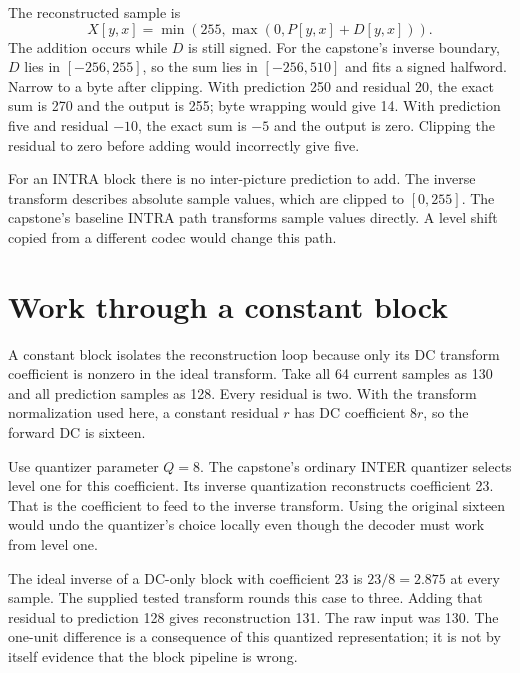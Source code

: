 The reconstructed sample is
\[
  X[y,x]=\min(255,\max(0,P[y,x]+D[y,x])).
\]
The addition occurs while $D$ is still signed. For the capstone's inverse boundary,
$D$ lies in $[-256,255]$, so the sum lies in $[-256,510]$ and fits a signed halfword.
Narrow to a byte after clipping. With prediction 250 and residual 20, the exact
sum is 270 and the output is 255; byte wrapping would give 14. With prediction
five and residual $-10$, the exact sum is $-5$ and the output is zero. Clipping
the residual to zero before adding would incorrectly give five.

For an INTRA block there is no inter-picture prediction to add. The inverse
transform describes absolute sample values, which are clipped to $[0,255]$.
The capstone's baseline INTRA path transforms sample values directly. A level
shift copied from a different codec would change this path.

\section{Work through a constant block}

A constant block isolates the reconstruction loop because only its DC transform
coefficient is nonzero in the ideal transform. Take all 64 current samples as
130 and all prediction samples as 128. Every residual is two. With the transform
normalization used here, a constant residual $r$ has DC coefficient $8r$, so the
forward DC is sixteen.

Use quantizer parameter $Q=8$. The capstone's ordinary INTER quantizer selects
level one for this coefficient. Its inverse quantization reconstructs coefficient
23. That is the coefficient to feed to the inverse transform. Using the original
sixteen would undo the quantizer's choice locally even though the decoder must
work from level one.

The ideal inverse of a DC-only block with coefficient 23 is $23/8=2.875$ at every
sample. The supplied tested transform rounds this case to three. Adding that
residual to prediction 128 gives reconstruction 131. The raw input was 130.
The one-unit difference is a consequence of this quantized representation; it
is not by itself evidence that the block pipeline is wrong.

